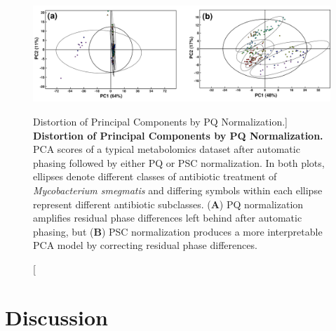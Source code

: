 \begin{figure}[ht!]
\includegraphics[width=6.5in]{figs/pscorr/05-scores.png}
\caption
      [Distortion of Principal Components by PQ Normalization.]{
  {\bf Distortion of Principal Components by PQ Normalization.}
  \\
  PCA scores of a typical metabolomics dataset after automatic phasing
  followed by either PQ or PSC normalization. In both plots, ellipses denote
  different classes of antibiotic treatment of \emph{Mycobacterium smegmatis}
  and differing symbols within each ellipse represent different antibiotic
  subclasses.
  ({\bf A}) PQ normalization amplifies residual phase differences left behind
  after automatic phasing, but ({\bf B}) PSC normalization produces a more
  interpretable PCA model by correcting residual phase differences.
}
\label{figure.6.5}
\end{figure}

\section{Discussion}


